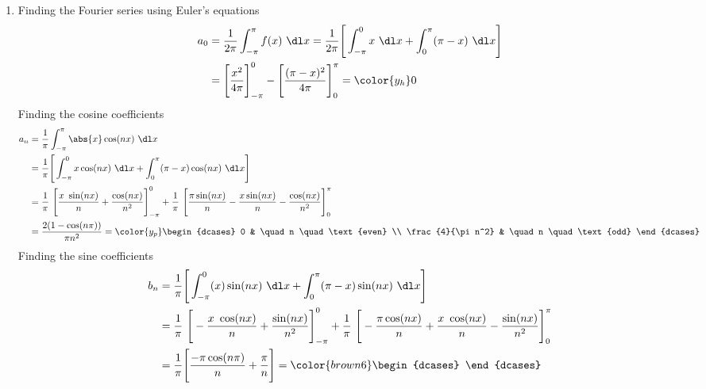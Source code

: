 \begin{enumerate}
    \item Finding the Fourier series using Euler's equations
          \begin{align}
              a_0 & = \frac{1}{2\pi} \int_{-\pi}^{\pi} f(x)\ \dl x
              = \frac{1}{2\pi} \Bigg[\int_{-\pi}^{0} x\ \dl x
              +  \int_{0}^{\pi} (\pi - x)\ \dl x\Bigg]             \\
                  & = \Bigg[ \frac{x^2}{4\pi} \Bigg]_{-\pi}^0
              - \Bigg[ \frac{(\pi - x)^2}{4\pi} \Bigg]_0^{\pi}
              = \color{y_h} 0
          \end{align}
          Finding the cosine coefficients
          \begin{align}
              a_n & = \frac{1}{\pi} \int_{-\pi}^{\pi} \abs{x} \cos(nx)\ \dl x \\
                  & = \frac{1}{\pi} \Bigg[\int_{-\pi}^{0} x \cos(nx)\ \dl x
              +  \int_{0}^{\pi} (\pi - x) \cos(nx)\ \dl x\Bigg]               \\
                  & = \frac{1}{\pi}\ \Bigg[ \frac{x\ \sin(nx)}{n}
                  + \frac{\cos(nx)}{n^2} \Bigg]_{-\pi}^{0}
              + \frac{1}{\pi}\ \Bigg[\frac{\pi \sin(nx)}{n} - \frac{x \sin(nx)}{n}
              - \frac{\cos(nx)}{n^2} \Bigg]_0^{\pi}                           \\
                  & = \frac{2(1 - \cos(n\pi))}{\pi n^2}
              = \color{y_p} \begin{dcases}
                                0                 & \quad n \quad \text{even} \\
                                \frac{4}{\pi n^2} & \quad n \quad \text{odd}
                            \end{dcases}
          \end{align}
          Finding the sine coefficients
          \begin{align}
              b_n & = \frac{1}{\pi} \Bigg[\int_{-\pi}^{0} (x) \sin(nx)\ \dl x
              +  \int_{0}^{\pi} (\pi - x) \sin(nx)\ \dl x\Bigg]               \\
                  & = \frac{1}{\pi}\ \Bigg[ -\frac{x\ \cos(nx)}{n}
                  + \frac{\sin(nx)}{n^2} \Bigg]_{-\pi}^{0}
              + \frac{1}{\pi}\ \Bigg[-\frac{\pi \cos(nx)}{n} + \frac{x\ \cos(nx)}{n}
              - \frac{\sin(nx)}{n^2} \Bigg]_{0}^{\pi}                         \\
                  & = \frac{1}{\pi} \Bigg[\frac{-\pi \cos(n\pi)}{n}
                  + \frac{\pi}{n}\Bigg]
              = \color{brown6}  \begin{dcases}

\end{dcases}
\end{align}
\end{enumerate}
